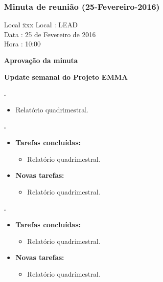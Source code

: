 \subsubsection{Minuta de reunião (25-Fevereiro-2016)}

\begin{tabbing}
  Local \= xxx \kill
  Local \> : LEAD \\
  Data  \> : 25 de Fevereiro de 2016 \\
  Hora  \> : 10:00
\end{tabbing} 


\textbf{Aprovação da minuta}

\textbf{Update semanal do Projeto EMMA}

						
\textbf{\gabriel.} 
	\begin{itemize}
			\item Relatório quadrimestral.
	\end{itemize}
		
					
   \textbf{.} 
	\begin{itemize}
		\item \textbf{Tarefas concluídas:}
			\begin{itemize}    
			\item Relatório quadrimestral.
				
			\end{itemize}
		
		\item \textbf{Novas tarefas:}
			\begin{itemize} 
			\item Relatório quadrimestral.
			\end{itemize}
	\end{itemize}

	
	  \textbf{\elael.} 
	\begin{itemize}
		\item \textbf{Tarefas concluídas:}
			\begin{itemize}    
			\item Relatório quadrimestral.
			\end{itemize}
		
		\item \textbf{Novas tarefas:}
			\begin{itemize} 
			\item Relatório quadrimestral.
			\end{itemize}
	\end{itemize}			
			
